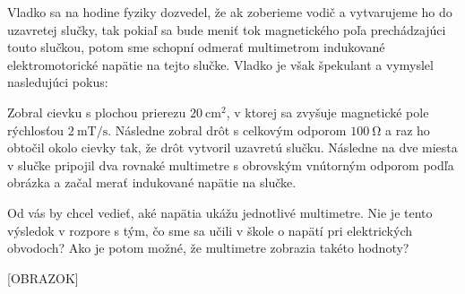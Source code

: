 Vladko sa na hodine fyziky dozvedel, že ak zoberieme vodič a vytvarujeme
ho do uzavretej slučky, tak pokiaľ sa bude meniť tok magnetického poľa
prechádzajúci touto slučkou, potom sme schopní odmerať multimetrom
indukované elektromotorické napätie na tejto slučke. Vladko je však
špekulant a vymyslel nasledujúci pokus:

Zobral cievku s plochou prierezu $\SI{20}{\centi\metre\squared}$, v
ktorej sa zvyšuje magnetické pole rýchlosťou
$\SI{2}{\milli\tesla\per\second}$. Následne zobral drôt s celkovým
odporom $\SI{100}{\ohm}$ a raz ho obtočil okolo cievky tak, že drôt
vytvoril uzavretú slučku. Následne na dve miesta v slučke pripojil dva
rovnaké multimetre s obrovským vnútorným odporom podľa obrázka a začal
merať indukované napätie na slučke.

Od vás by chcel vedieť, aké napätia ukážu jednotlivé multimetre. Nie je
tento výsledok v rozpore s tým, čo sme sa učili v škole o napätí pri
elektrických obvodoch? Ako je potom možné, že multimetre zobrazia takéto
hodnoty?

{[}OBRAZOK{]}
